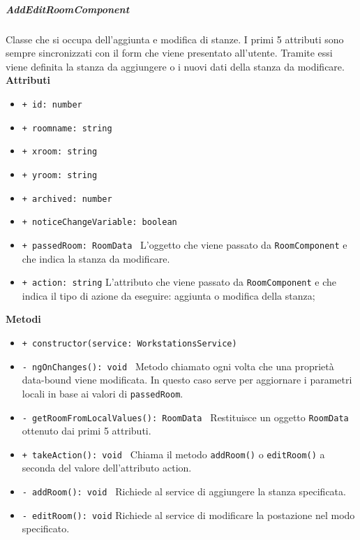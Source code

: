 \subparagraph{AddEditRoomComponent}
Classe che si occupa dell'aggiunta e modifica di stanze. I primi 5 attributi sono sempre sincronizzati con il form che viene presentato all'utente. Tramite essi viene definita la stanza da aggiungere o i nuovi dati della stanza da modificare.\newline
\textbf{Attributi}
\begin{itemize}
	\item \texttt{+ id: number 	}
	\item \texttt{+ roomname: string 	}
	\item \texttt{+ xroom: string 	}
	\item \texttt{+ yroom: string 	}
	\item \texttt{+ archived: number 	}
	\item \texttt{+ noticeChangeVariable: boolean 	}
	\item \texttt{+ passedRoom: RoomData 	} \newline
	L'oggetto che viene passato da \texttt{RoomComponent} e che indica la stanza da modificare.
	\item \texttt{+ action: string} \newline
	L'attributo che viene passato da \texttt{RoomComponent} e che indica il tipo di azione da eseguire: aggiunta o modifica della stanza;
\end{itemize}
\textbf{Metodi}
\begin{itemize}
	\item \texttt{+ constructor(service: WorkstationsService) 	}
	\item \texttt{- ngOnChanges(): void 	} \newline
	Metodo chiamato ogni volta che una proprietà data-bound viene modificata. In questo caso serve per aggiornare i parametri locali in base ai valori di \texttt{passedRoom}.
	\item \texttt{- getRoomFromLocalValues(): RoomData 	} \newline
	Restituisce un oggetto \texttt{RoomData} ottenuto dai primi 5 attributi.
	\item \texttt{+ takeAction(): void 	} \newline
	Chiama il metodo \texttt{addRoom()} o \texttt{editRoom()} a seconda del valore dell'attributo action.
	\item \texttt{- addRoom(): void 	} \newline
	Richiede al service di aggiungere la stanza specificata.
	\item \texttt{- editRoom(): void} \newline
	Richiede al service di modificare la postazione nel modo specificato.
\end{itemize}
